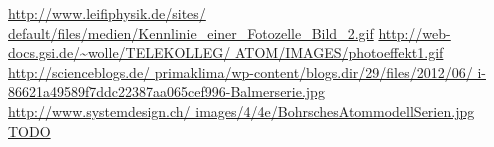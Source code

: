 \documentclass[pdftex, a4paper,11pt, twoside, ngerman]{report}
\begin{document}
  
  
  \begin{thebibliography}{99}
    \scriptsize
    \url{http://www.leifiphysik.de/sites/
        default/files/medien/Kennlinie_einer_Fotozelle_Bild_2.gif}
    \url{http://web-docs.gsi.de/~wolle/TELEKOLLEG/
        ATOM/IMAGES/photoeffekt1.gif}
    \url{http://scienceblogs.de/
        primaklima/wp-content/blogs.dir/29/files/2012/06/
        i-86621a49589f7ddc22387aa065cef996-Balmerserie.jpg}
    \url{http://www.systemdesign.ch/
        images/4/4e/BohrschesAtommodellSerien.jpg}
     \url{TODO}
    
  \end{thebibliography}
  
\end{document}
